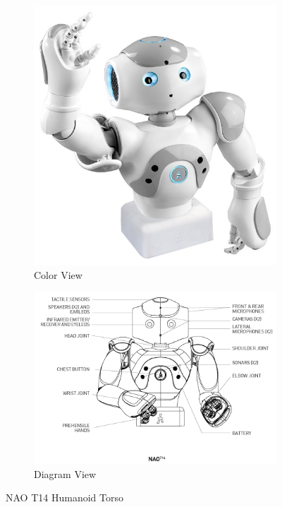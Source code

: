 \begin{figure} [h]
	\begin{subfigure}[b]{0.39\textwidth}
		\includegraphics[width=1.1\linewidth]{./img/nao-torso.jpg}
		\caption{Color View}
	\end{subfigure}
	\begin{subfigure}[b]{0.59\textwidth}
		\includegraphics[width=1.1\linewidth]{./img/nao_t14_schema.png}
		\caption{Diagram View}
	\end{subfigure}%
	\centering
	\caption{NAO T14 Humanoid Torso}
	\label{fig:NAOColor}
\end{figure}


